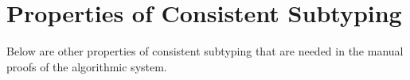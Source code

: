 \renewcommand{\listtheoremname}{List of Lemmas and Theorems}
\listoftheorems[ignoreall, show={mlemma,clemma,mtheorem,ctheorem}]
\renewcommand{\hlmath}{}




\section{Properties of Consistent Subtyping}

Below are other properties of consistent subtyping that are needed in the manual
proofs of the algorithmic system.


